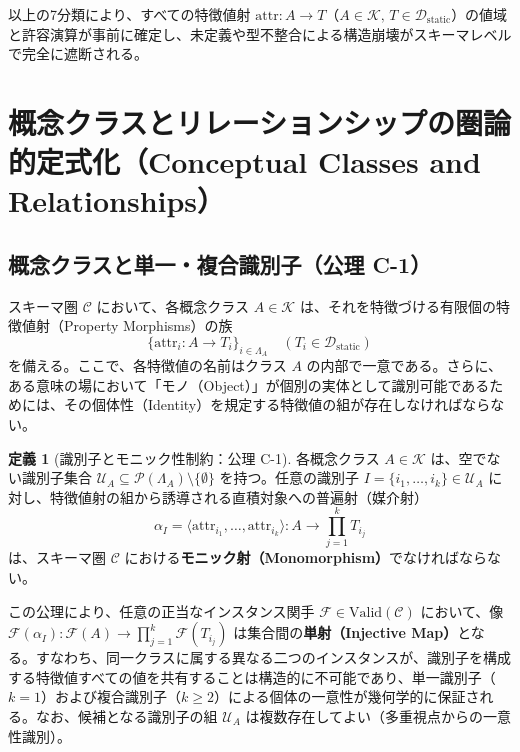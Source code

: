 \documentclass[11pt,a4paper]{ltjsarticle}
\theoremstyle{definition}
\newtheorem{definition}{定義}[section]
\theoremstyle{plain}
\theoremstyle{remark}
\newcommand{\Valid}{\mathrm{Valid}}
\newcommand{\Dstatic}{\mathcal{D}_{\mathrm{static}}}
\begin{document}
以上の7分類により、すべての特徴値射 $\mathrm{attr} : A \to T$（$A \in \mathcal{K},\, T \in \Dstatic$）の値域と許容演算が事前に確定し、未定義や型不整合による構造崩壊がスキーマレベルで完全に遮断される。

\section{概念クラスとリレーションシップの圏論的定式化（Conceptual Classes and Relationships）}

\subsection{概念クラスと単一・複合識別子（公理 C-1）}
スキーマ圏 $\mathcal{C}$ において、各概念クラス $A \in \mathcal{K}$ は、それを特徴づける有限個の特徴値射（Property Morphisms）の族
\begin{equation}
\{\mathrm{attr}_i : A \to T_i\}_{i \in \Lambda_A} \quad (T_i \in \Dstatic)
\end{equation}
を備える。ここで、各特徴値の名前はクラス $A$ の内部で一意である。さらに、ある意味の場において「モノ（Object）」が個別の実体として識別可能であるためには、その個体性（Identity）を規定する特徴値の組が存在しなければならない。

\begin{definition}[識別子とモニック性制約：公理 C-1]\label{def:identifier}
各概念クラス $A \in \mathcal{K}$ は、空でない識別子集合 $\mathcal{U}_A \subseteq \mathcal{P}(\Lambda_A) \setminus \{\emptyset\}$ を持つ。任意の識別子 $I = \{i_1, \dots, i_k\} \in \mathcal{U}_A$ に対し、特徴値射の組から誘導される直積対象への普遍射（媒介射）
\begin{equation}
\alpha_I = \langle \mathrm{attr}_{i_1}, \dots, \mathrm{attr}_{i_k} \rangle : A \longrightarrow \prod_{j=1}^k T_{i_j}
\end{equation}
は、スキーマ圏 $\mathcal{C}$ における\textbf{モニック射（Monomorphism）}でなければならない。
\end{definition}

この公理により、任意の正当なインスタンス関手 $\mathcal{F} \in \Valid(\mathcal{C})$ において、像 $\mathcal{F}(\alpha_I) : \mathcal{F}(A) \to \prod_{j=1}^k \mathcal{F}(T_{i_j})$ は集合間の\textbf{単射（Injective Map）}となる。すなわち、同一クラスに属する異なる二つのインスタンスが、識別子を構成する特徴値すべての値を共有することは構造的に不可能であり、単一識別子（$k=1$）および複合識別子（$k \ge 2$）による個体の一意性が幾何学的に保証される。なお、候補となる識別子の組 $\mathcal{U}_A$ は複数存在してよい（多重視点からの一意性識別）。
\end{document}
